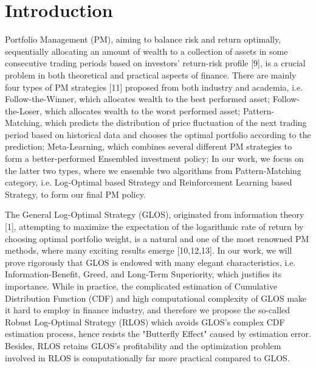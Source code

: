 \documentclass{gapd}
\begin{document}
\maketitle

\section{Introduction}
\label{sec:Introduction}

Portfolio Management (PM), aiming to balance risk and return optimally, sequentially allocating an amount of wealth to a collection of assets in some consecutive trading periods based on investors' return-risk profile [9], is a crucial problem in both theoretical and practical aspects of finance. There are mainly four types of PM strategies [11] proposed from both industry and academia, i.e. Follow-the-Winner, which allocates wealth to the best performed asset; Follow-the-Loser, which allocates wealth to the worst performed asset; Pattern-Matching, which predicts the distribution of price fluctuation of the next trading period based on historical data and chooses the optimal portfolio according to the prediction; Meta-Learning, which combines several different PM strategies to form a better-performed Ensembled investment policy; In our work, we focus on the latter two types, where we ensemble two algorithms from Pattern-Matching category, i.e. Log-Optimal based Strategy and Reinforcement Learning based Strategy, to form our final PM policy.

The General Log-Optimal Strategy (GLOS), originated from information theory [1], attempting to maximize the expectation of the logarithmic rate of return by choosing optimal portfolio weight, is a natural and one of the most renowned PM methods, where many exciting results emerge [10,12,13]. In our work, we will prove rigorously that GLOS is endowed with many elegant characteristics, i.e. Information-Benefit, Greed, and Long-Term Superiority, which justifies its importance. While in practice, the complicated estimation of Cumulative Distribution Function (CDF) and high computational complexity of GLOS make it hard to employ in finance industry, and therefore we propose the so-called Robust Log-Optimal Strategy (RLOS) which avoids GLOS's complex CDF estimation process, hence resists the "Butterfly Effect" caused by estimation error. Besides, RLOS retains GLOS's profitability and the optimization problem involved in RLOS is computationally far more practical compared to GLOS. 
\end{document}

